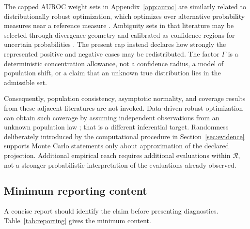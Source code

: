 \documentclass[11pt]{article}
\newcommand{\Regime}{\mathcal{R}}
\theoremstyle{remark}
\begin{document}
The capped AUROC weight sets in Appendix~\ref{app:auroc} are similarly related
to distributionally robust optimization, which optimizes over alternative
probability measures near a reference measure \cite{shapiro2017distributionally}.
Ambiguity sets in that literature may be selected through divergence geometry
and calibrated as confidence regions for uncertain probabilities
\cite{bental2013robust}. The present cap instead declares how strongly the
represented positive and negative cases may be redistributed. The factor
$\Gamma$ is a deterministic concentration allowance, not a confidence radius,
a model of population shift, or a claim that an unknown true distribution lies
in the admissible set.

Consequently, population consistency, asymptotic normality, and coverage
results from these adjacent literatures are not invoked. Data-driven robust
optimization can obtain such coverage by assuming independent observations
from an unknown population law \cite{duchi2021statistics}; that is a different
inferential target. Randomness deliberately introduced by the computational
procedure in Section~\ref{sec:evidence} supports Monte Carlo statements only
about approximation of the declared projection. Additional empirical reach
requires additional evaluations within $\Regime$, not a stronger probabilistic
interpretation of the evaluations already observed.

\subsection{Minimum reporting content}

A concise report should identify the claim before presenting diagnostics. Table~\ref{tab:reporting} gives the minimum content.
\end{document}
